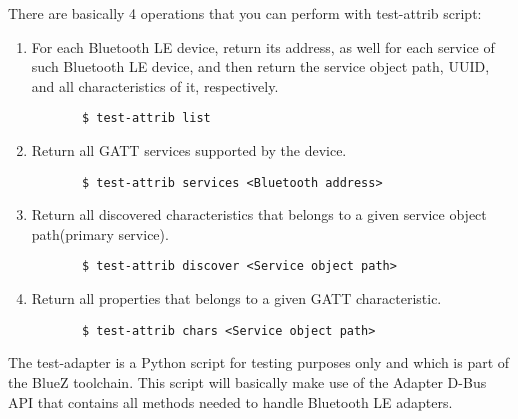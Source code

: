 \documentclass[11pt]{article}
\begin{document}
There are basically 4 operations that you can perform with test-attrib
script:
\begin{enumerate}
   \item For each Bluetooth LE device, return its address, as well for
     each service of such Bluetooth LE device, and then return the service
     object path, UUID, and all characteristics of it, respectively.
     \begin{verbatim}
       $ test-attrib list
     \end{verbatim}
   \item Return all GATT services supported by the device.
     \begin{verbatim}
       $ test-attrib services <Bluetooth address>
     \end{verbatim}
   \item Return all discovered characteristics that belongs to a
     given service object path(primary service).
     \begin{verbatim}
       $ test-attrib discover <Service object path>
     \end{verbatim}
   \item Return all properties that belongs to a given GATT characteristic.
     \begin{verbatim}
       $ test-attrib chars <Service object path>
     \end{verbatim}
\end{enumerate}

The test-adapter is a Python script for testing purposes only and which is part
of the BlueZ toolchain. This script will basically make use of the
Adapter D-Bus API that contains all methods needed to handle Bluetooth LE
adapters.
\end{document}
